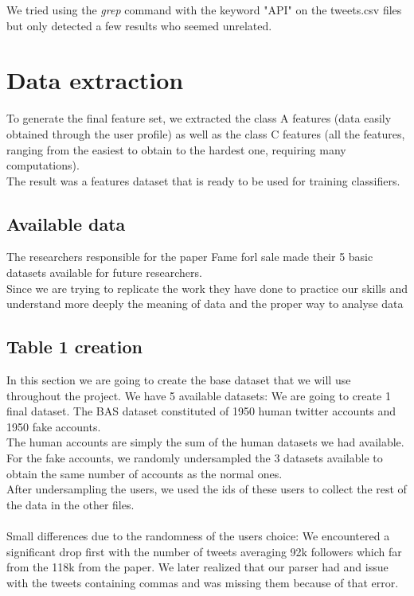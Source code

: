 \documentclass[a4paper,11pt]{article}
\begin{document}
We tried using the \textit{grep} command with the keyword "API" on the tweets.csv files but only detected a few results who seemed unrelated.

\section{Data extraction}
To generate the final feature set, we extracted the class A features (data easily obtained through the user profile) as well as the class C features (all the features, ranging from the easiest to obtain to the hardest one, requiring many computations).\\

The result was a features dataset that is ready to be used for training classifiers.

\subsection{Available data}
The researchers responsible for the paper Fame forl sale made their 5 basic datasets available for future researchers.\\ 

Since we are trying to replicate the work they have done to practice our skills and understand more deeply the meaning of data and the proper way to analyse data

\subsection{Table 1 creation}
In this section we are going to create the base dataset that we will use throughout the project.
We have 5 available datasets: 
We are going to create 1 final dataset. The BAS dataset constituted of 1950 human twitter accounts and 1950 fake accounts.\\ The human accounts are simply the sum of the human datasets we had available.\\
For the fake accounts, we randomly undersampled the 3 datasets available to obtain the same number of accounts as the normal ones.\\
After undersampling the users, we used the ids of these users to collect the rest of the data in the other files.\\\\
Small differences due to the randomness of the users choice:
We encountered a significant drop first with the number of tweets averaging 92k followers which far from the 118k from the paper. We later realized that our parser had and issue with the tweets containing commas and was missing them because of that error.\\
\end{document}
